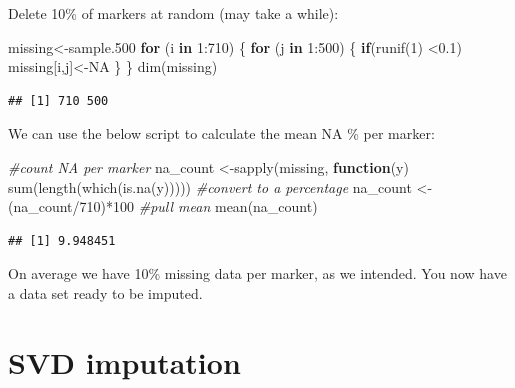 \documentclass[
]{book}
\newenvironment{Shaded}{\begin{snugshade}}{\end{snugshade}}
\newcommand{\CommentTok}[1]{\textcolor[rgb]{0.56,0.35,0.01}{\textit{#1}}}
\newcommand{\ConstantTok}[1]{\textcolor[rgb]{0.00,0.00,0.00}{#1}}
\newcommand{\ControlFlowTok}[1]{\textcolor[rgb]{0.13,0.29,0.53}{\textbf{#1}}}
\newcommand{\DecValTok}[1]{\textcolor[rgb]{0.00,0.00,0.81}{#1}}
\newcommand{\FloatTok}[1]{\textcolor[rgb]{0.00,0.00,0.81}{#1}}
\newcommand{\FunctionTok}[1]{\textcolor[rgb]{0.00,0.00,0.00}{#1}}
\newcommand{\NormalTok}[1]{#1}
\newcommand{\OtherTok}[1]{\textcolor[rgb]{0.56,0.35,0.01}{#1}}
\newcommand{\SpecialCharTok}[1]{\textcolor[rgb]{0.00,0.00,0.00}{#1}}
\begin{document}
Delete 10\% of markers at random (may take a while):

\begin{Shaded}
\begin{Highlighting}[]
\NormalTok{missing}\OtherTok{\textless{}{-}}\NormalTok{sample}\FloatTok{.500}
\ControlFlowTok{for}\NormalTok{ (i }\ControlFlowTok{in} \DecValTok{1}\SpecialCharTok{:}\DecValTok{710}\NormalTok{) \{}
  \ControlFlowTok{for}\NormalTok{ (j }\ControlFlowTok{in} \DecValTok{1}\SpecialCharTok{:}\DecValTok{500}\NormalTok{)  \{}
    \ControlFlowTok{if}\NormalTok{(}\FunctionTok{runif}\NormalTok{(}\DecValTok{1}\NormalTok{) }\SpecialCharTok{\textless{}}\FloatTok{0.1}\NormalTok{) missing[i,j]}\OtherTok{\textless{}{-}}\ConstantTok{NA}
\NormalTok{  \}}
\NormalTok{\}}
\FunctionTok{dim}\NormalTok{(missing) }
\end{Highlighting}
\end{Shaded}

\begin{verbatim}
## [1] 710 500
\end{verbatim}

We can use the below script to calculate the mean NA \% per marker:

\begin{Shaded}
\begin{Highlighting}[]
\CommentTok{\#count NA per marker}
\NormalTok{na\_count }\OtherTok{\textless{}{-}}\FunctionTok{sapply}\NormalTok{(missing, }\ControlFlowTok{function}\NormalTok{(y) }\FunctionTok{sum}\NormalTok{(}\FunctionTok{length}\NormalTok{(}\FunctionTok{which}\NormalTok{(}\FunctionTok{is.na}\NormalTok{(y)))))}
\CommentTok{\#convert to a percentage}
\NormalTok{na\_count }\OtherTok{\textless{}{-}}\NormalTok{(na\_count}\SpecialCharTok{/}\DecValTok{710}\NormalTok{)}\SpecialCharTok{*}\DecValTok{100}
\CommentTok{\#pull mean}
\FunctionTok{mean}\NormalTok{(na\_count)}
\end{Highlighting}
\end{Shaded}

\begin{verbatim}
## [1] 9.948451
\end{verbatim}

On average we have 10\% missing data per marker, as we intended. You now have a data set ready to be imputed.

\hypertarget{svd-imputation}{%
\section{SVD imputation}\label{svd-imputation}}
\end{document}
